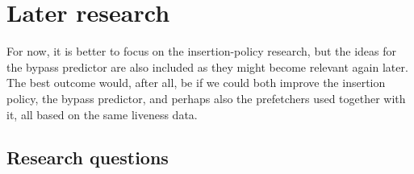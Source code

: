 \documentclass[12pt]{article}
\begin{document}
\section{Later research}

For now, it is better to focus on the insertion-policy research, but the ideas for
the bypass predictor are also included as they might become relevant again later.
The best outcome would, after all, be if we could both improve the insertion policy,
the bypass predictor, and perhaps also the prefetchers used together with it, all
based on the same liveness data.

\subsection{Research questions}
\end{document}
